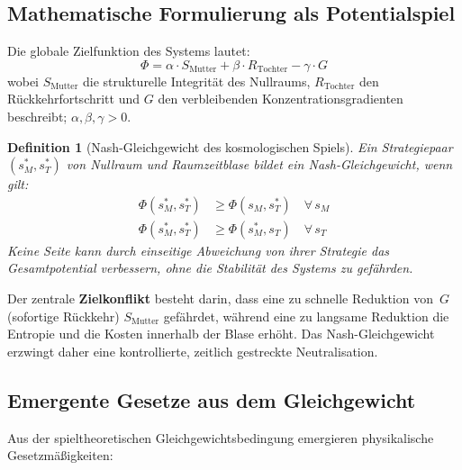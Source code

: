 \documentclass[aps,prd,twocolumn,superscriptaddress,nofootinbib]{revtex4-2}
\newtheorem{definition}{Definition}
\begin{document}
\subsection{Mathematische Formulierung als Potentialspiel}
\label{subsec:potentialspiel}

Die globale Zielfunktion des Systems lautet:
\begin{equation}
\Phi = \alpha \cdot S_{\mathrm{Mutter}} + \beta \cdot R_{\mathrm{Tochter}} - \gamma \cdot G
\label{eq:potential}
\end{equation}
wobei $S_{\mathrm{Mutter}}$ die strukturelle Integrit\"at des Nullraums, $R_{\mathrm{Tochter}}$ den R\"uckkehrfortschritt und $G$ den verbleibenden Konzentrationsgradienten beschreibt; $\alpha, \beta, \gamma > 0$.

\begin{definition}[Nash-Gleichgewicht des kosmologischen Spiels]
Ein Strategiepaar $(s_M^*, s_T^*)$ von Nullraum und Raumzeitblase bildet ein Nash-Gleichgewicht, wenn gilt:
\begin{align}
\Phi(s_M^*, s_T^*) &\geq \Phi(s_M, s_T^*) \quad \forall\, s_M \\
\Phi(s_M^*, s_T^*) &\geq \Phi(s_M^*, s_T) \quad \forall\, s_T
\end{align}
Keine Seite kann durch einseitige Abweichung von ihrer Strategie das Gesamtpotential verbessern, ohne die Stabilit\"at des Systems zu gef\"ahrden.
\end{definition}

Der zentrale \textbf{Zielkonflikt} besteht darin, dass eine zu schnelle Reduktion von~$G$ (sofortige R\"uckkehr) $S_{\mathrm{Mutter}}$ gef\"ahrdet, w\"ahrend eine zu langsame Reduktion die Entropie und die Kosten innerhalb der Blase erh\"oht. Das Nash-Gleichgewicht erzwingt daher eine kontrollierte, zeitlich gestreckte Neutralisation.

\subsection{Emergente Gesetze aus dem Gleichgewicht}
\label{subsec:emergente_gesetze}

Aus der spieltheoretischen Gleichgewichtsbedingung emergieren physikalische Gesetzm\"a\ss{}igkeiten:
\end{document}

